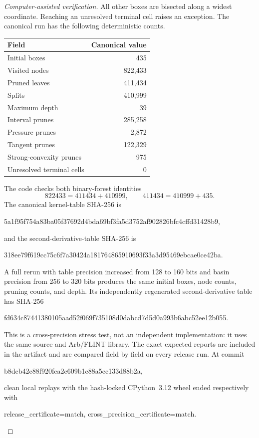 \documentclass[11pt]{article}
\begin{document}
\begin{proof}[Computer-assisted verification]
All other boxes are bisected along a widest coordinate.  Reaching an
unresolved terminal cell raises an exception.  The canonical run has the
following deterministic counts.
\begin{center}
\begin{tabular}{lr}
\toprule
Field & Canonical value\\
\midrule
Initial boxes & 435\\
Visited nodes & 822,433\\
Pruned leaves & 411,434\\
Splits & 410,999\\
Maximum depth & 39\\
Interval prunes & 285,258\\
Pressure prunes & 2,872\\
Tangent prunes & 122,329\\
Strong-convexity prunes & 975\\
Unresolved terminal cells & 0\\
\bottomrule
\end{tabular}
\end{center}
The code checks both binary-forest identities
\[
 822433=411434+410999,
 \qquad411434=410999+435.
\]
The canonical kernel-table SHA-256 is
\begin{sloppypar}
\small\ttfamily
5a1f95f754a83ba05f37692d4bda69bf3fa5d3752af902826bfc4cffd31428b9,
\end{sloppypar}
and the second-derivative-table SHA-256 is
\begin{sloppypar}
\small\ttfamily
318ee79f619cc75c6f7a30424a181764865910693f33a3d95469ebcae0ce42ba.
\end{sloppypar}

A full rerun with table precision increased from 128 to 160 bits and basin
precision from 256 to 320 bits produces the same initial boxes, node counts,
pruning counts, and depth.  Its independently regenerated second-derivative
table has SHA-256
\begin{sloppypar}
\small\ttfamily
fd634c87441380105aad52f069f735108d0dabcd7d5d0a993b6abc52ee12b055.
\end{sloppypar}
This is a cross-precision stress test, not an independent implementation: it
uses the same source and Arb/FLINT library.  The exact expected reports are
included in the artifact and are compared field by field on every release
run.  At commit
\begin{center}
\small\ttfamily b8dcb42c88f920fca2c609b1c88a5cc133d88b2a,
\end{center}
clean local replays with the hash-locked CPython~3.12 wheel ended respectively
with
\begin{center}
\small\ttfamily
release\_certificate=match,\qquad
cross\_precision\_certificate=match.
\end{center}


\end{proof}
\end{document}

